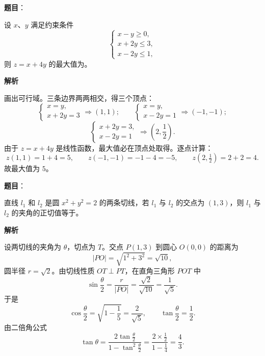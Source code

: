\begin{answer}

\textbf{题目}：

设 $x$、$y$ 满足约束条件
\nopagebreak[4]
\[\begin{cases}
x-y\geqslant 0,\\
x+2y\leqslant 3,\\
x-2y\leqslant 1,
\end{cases}\]
则 $z=x+4y$ 的最大值为\gkblank{}。

\textbf{解析}

画出可行域。三条边界两两相交，得三个顶点：
\nopagebreak[4]
\[\begin{cases}x=y,\\ x+2y=3\end{cases}\Longrightarrow (1,1);\qquad
\begin{cases}x=y,\\ x-2y=1\end{cases}\Longrightarrow (-1,-1);\]
\nopagebreak[4]
\[\begin{cases}x+2y=3,\\ x-2y=1\end{cases}\Longrightarrow \left(2,\frac12\right).\]
由于 $z=x+4y$ 是线性函数，最大值必在顶点处取得。逐点计算：
\nopagebreak[4]
\[z(1,1)=1+4=5,\qquad z(-1,-1)=-1-4=-5,\qquad z\left(2,\tfrac12\right)=2+2=4.\]
故最大值为 $5$。


\end{answer}
\begin{answer}

\textbf{题目}：

直线 $l_1$ 和 $l_2$ 是圆 $x^2+y^2=2$ 的两条切线，若 $l_1$ 与 $l_2$ 的交点为 $(1,3)$，则 $l_1$ 与 $l_2$ 的夹角的正切值等于\gkblank{}。

\textbf{解析}

设两切线的夹角为 $\theta$，切点为 $T$。交点 $P(1,3)$ 到圆心 $O(0,0)$ 的距离为
\nopagebreak[4]
\[|PO|=\sqrt{1^2+3^2}=\sqrt{10},\]
圆半径 $r=\sqrt2$。由切线性质 $OT\perp PT$，在直角三角形 $POT$ 中
\nopagebreak[4]
\[\sin\frac{\theta}{2}=\frac{r}{|PO|}=\frac{\sqrt2}{\sqrt{10}}=\frac1{\sqrt5}.\]
于是
\nopagebreak[4]
\[\cos\frac{\theta}{2}=\sqrt{1-\frac15}=\frac{2}{\sqrt5},\qquad
\tan\frac{\theta}{2}=\frac{1}{2}.\]
由二倍角公式
\nopagebreak[4]
\[\tan\theta=\frac{2\tan\frac{\theta}{2}}{1-\tan^2\frac{\theta}{2}}
=\frac{2\times\frac12}{1-\frac14}=\frac43.\]


\end{answer}
